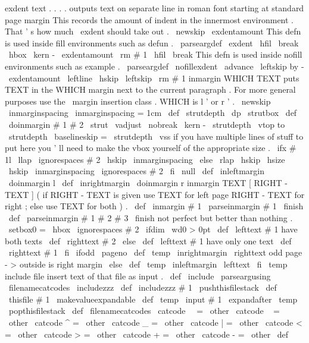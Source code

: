 {{}
%
exdent
text
.
.
.
.
%
outputs
text
on
separate
line
in
roman
font
starting
at
standard
page
margin
%
This
records
the
amount
of
indent
in
the
innermost
environment
.
%
That
'
s
how
much
\
exdent
should
take
out
.
\
newskip
\
exdentamount
%
This
defn
is
used
inside
fill
environments
such
as
defun
.
\
parseargdef
\
exdent
{
\
hfil
\
break
\
hbox
{
\
kern
-
\
exdentamount
{
\
rm
#
1
}
}
\
hfil
\
break
}
%
This
defn
is
used
inside
nofill
environments
such
as
example
.
\
parseargdef
\
nofillexdent
{
{
\
advance
\
leftskip
by
-
\
exdentamount
\
leftline
{
\
hskip
\
leftskip
{
\
rm
#
1
}
}
}
}
%
inmargin
{
WHICH
}
{
TEXT
}
puts
TEXT
in
the
WHICH
margin
next
to
the
current
%
paragraph
.
For
more
general
purposes
use
the
\
margin
insertion
%
class
.
WHICH
is
l
'
or
r
'
.
%
\
newskip
\
inmarginspacing
\
inmarginspacing
=
1cm
\
def
\
strutdepth
{
\
dp
\
strutbox
}
%
\
def
\
doinmargin
#
1
#
2
{
\
strut
\
vadjust
{
%
\
nobreak
\
kern
-
\
strutdepth
\
vtop
to
\
strutdepth
{
%
\
baselineskip
=
\
strutdepth
\
vss
%
if
you
have
multiple
lines
of
stuff
to
put
here
you
'
ll
need
to
%
make
the
vbox
yourself
of
the
appropriate
size
.
\
ifx
#
1l
%
\
llap
{
\
ignorespaces
#
2
\
hskip
\
inmarginspacing
}
%
\
else
\
rlap
{
\
hskip
\
hsize
\
hskip
\
inmarginspacing
\
ignorespaces
#
2
}
%
\
fi
\
null
}
%
}
}
\
def
\
inleftmargin
{
\
doinmargin
l
}
\
def
\
inrightmargin
{
\
doinmargin
r
}
%
%
inmargin
{
TEXT
[
RIGHT
-
TEXT
]
}
%
(
if
RIGHT
-
TEXT
is
given
use
TEXT
for
left
page
RIGHT
-
TEXT
for
right
;
%
else
use
TEXT
for
both
)
.
%
\
def
\
inmargin
#
1
{
\
parseinmargin
#
1
\
finish
}
\
def
\
parseinmargin
#
1
#
2
#
3
\
finish
{
%
not
perfect
but
better
than
nothing
.
\
setbox0
=
\
hbox
{
\
ignorespaces
#
2
}
%
\
ifdim
\
wd0
>
0pt
\
def
\
lefttext
{
#
1
}
%
have
both
texts
\
def
\
righttext
{
#
2
}
%
\
else
\
def
\
lefttext
{
#
1
}
%
have
only
one
text
\
def
\
righttext
{
#
1
}
%
\
fi
%
\
ifodd
\
pageno
\
def
\
temp
{
\
inrightmargin
\
righttext
}
%
odd
page
-
>
outside
is
right
margin
\
else
\
def
\
temp
{
\
inleftmargin
\
lefttext
}
%
\
fi
\
temp
}
%
include
file
insert
text
of
that
file
as
input
.
%
\
def
\
include
{
\
parseargusing
\
filenamecatcodes
\
includezzz
}
\
def
\
includezzz
#
1
{
%
\
pushthisfilestack
\
def
\
thisfile
{
#
1
}
%
{
%
\
makevalueexpandable
\
def
\
temp
{
\
input
#
1
}
%
\
expandafter
}
\
temp
\
popthisfilestack
}
\
def
\
filenamecatcodes
{
%
\
catcode
\
\
=
\
other
\
catcode
~
=
\
other
\
catcode
^
=
\
other
\
catcode
_
=
\
other
\
catcode
|
=
\
other
\
catcode
<
=
\
other
\
catcode
>
=
\
other
\
catcode
+
=
\
other
\
catcode
-
=
\
other
}
\
def
\
}
